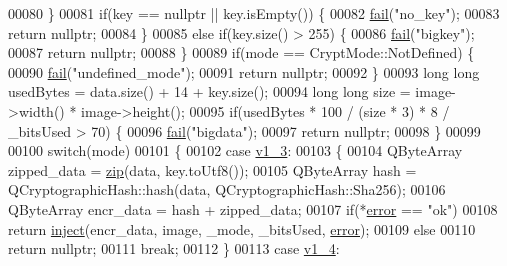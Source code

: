 \begin{DoxyCode}
00080     \}
00081     \textcolor{keywordflow}{if}(key == \textcolor{keyword}{nullptr} || key.isEmpty()) \{
00082         \hyperlink{class_model_p_c_a47464b59b7e37fcee25e55475708aabd}{fail}(\textcolor{stringliteral}{"no\_key"});
00083         \textcolor{keywordflow}{return} \textcolor{keyword}{nullptr};
00084     \}
00085     \textcolor{keywordflow}{else} \textcolor{keywordflow}{if}(key.size() > 255) \{
00086         \hyperlink{class_model_p_c_a47464b59b7e37fcee25e55475708aabd}{fail}(\textcolor{stringliteral}{"bigkey"});
00087         \textcolor{keywordflow}{return} \textcolor{keyword}{nullptr};
00088     \}
00089     \textcolor{keywordflow}{if}(mode == CryptMode::NotDefined) \{
00090         \hyperlink{class_model_p_c_a47464b59b7e37fcee25e55475708aabd}{fail}(\textcolor{stringliteral}{"undefined\_mode"});
00091         \textcolor{keywordflow}{return} \textcolor{keyword}{nullptr};
00092     \}
00093     \textcolor{keywordtype}{long} \textcolor{keywordtype}{long} usedBytes = data.size() + 14 + key.size();
00094     \textcolor{keywordtype}{long} \textcolor{keywordtype}{long} size = image->width() * image->height();
00095     \textcolor{keywordflow}{if}(usedBytes * 100 / (size * 3) * 8 / \_bitsUsed > 70) \{
00096         \hyperlink{class_model_p_c_a47464b59b7e37fcee25e55475708aabd}{fail}(\textcolor{stringliteral}{"bigdata"});
00097         \textcolor{keywordflow}{return} \textcolor{keyword}{nullptr};
00098     \}
00099 
00100     \textcolor{keywordflow}{switch}(mode)
00101     \{
00102         \textcolor{keywordflow}{case} \hyperlink{class_model_p_c_a296dd7afe3e1c49b3da25fd644fe4ceba7612e38de7178170655a56ddcf96e12c}{v1\_3}:
00103         \{
00104             QByteArray zipped\_data = \hyperlink{class_model_p_c_afebbbfa4b07deba4f68fc6dfb50f353f}{zip}(data, key.toUtf8());
00105             QByteArray hash = QCryptographicHash::hash(data, QCryptographicHash::Sha256);
00106             QByteArray encr\_data = hash + zipped\_data;
00107             \textcolor{keywordflow}{if}(*\hyperlink{class_model_p_c_a4e5a9c0ca1f06fe5bc478b6bf248c37c}{error} == \textcolor{stringliteral}{"ok"})
00108                 \textcolor{keywordflow}{return} \hyperlink{class_model_p_c_aada6a04d81ada8f2b4ba18108c8d6f10}{inject}(encr\_data, image, \_mode, \_bitsUsed, \hyperlink{class_model_p_c_a4e5a9c0ca1f06fe5bc478b6bf248c37c}{error});
00109             \textcolor{keywordflow}{else}
00110                 \textcolor{keywordflow}{return} \textcolor{keyword}{nullptr};
00111             \textcolor{keywordflow}{break};
00112         \}
00113         \textcolor{keywordflow}{case} \hyperlink{class_model_p_c_a296dd7afe3e1c49b3da25fd644fe4ceba43138df6b33a6b2bf608768907f95abc}{v1\_4}:

\end{DoxyCode}
